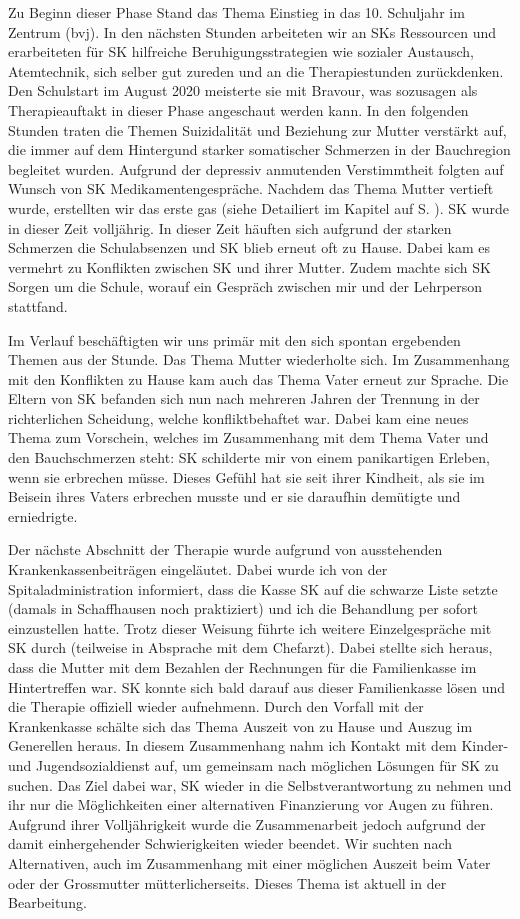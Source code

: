 Zu Beginn dieser Phase Stand das Thema Einstieg in das 10. Schuljahr im Zentrum (\ac{bvj}). In den nächsten Stunden arbeiteten wir an SKs Ressourcen und erarbeiteten für SK hilfreiche Beruhigungsstrategien wie sozialer Austausch, Atemtechnik, sich selber gut zureden und an die Therapiestunden zurückdenken. Den Schulstart im August 2020 meisterte sie mit Bravour, was sozusagen als Therapieauftakt in dieser Phase angeschaut werden kann. In den folgenden Stunden traten die Themen Suizidalität und Beziehung zur Mutter verstärkt auf, die immer auf dem Hintergund starker somatischer Schmerzen in der Bauchregion begleitet wurden. Aufgrund der depressiv anmutenden Verstimmtheit folgten auf Wunsch von SK Medikamentengespräche. Nachdem das Thema Mutter vertieft wurde, erstellten wir das erste \ac{gas} (siehe Detailiert im Kapitel \textit{ } auf S. \pageref{sec:Evaluationsverfahren}). SK wurde in dieser Zeit volljährig. In dieser Zeit häuften sich aufgrund der starken Schmerzen die Schulabsenzen und SK blieb erneut oft zu Hause. Dabei kam es vermehrt zu Konflikten zwischen SK und ihrer Mutter. Zudem machte sich SK Sorgen um die Schule, worauf ein Gespräch zwischen mir und der Lehrperson stattfand. 

Im Verlauf beschäftigten wir uns primär mit den sich spontan ergebenden Themen aus der Stunde. Das Thema Mutter wiederholte sich. Im Zusammenhang mit den Konflikten zu Hause kam auch das Thema Vater erneut zur Sprache. Die Eltern von SK befanden sich nun nach mehreren Jahren der Trennung in der richterlichen Scheidung, welche konfliktbehaftet war. Dabei kam eine neues Thema zum Vorschein, welches im Zusammenhang mit dem Thema Vater und den Bauchschmerzen steht: SK schilderte mir von einem panikartigen Erleben, wenn sie erbrechen müsse. Dieses Gefühl hat sie seit ihrer Kindheit, als sie im Beisein ihres Vaters erbrechen musste und er sie daraufhin demütigte und erniedrigte. 

Der nächste Abschnitt der Therapie wurde aufgrund von ausstehenden Krankenkassenbeiträgen eingeläutet. Dabei wurde ich von der Spitaladministration informiert, dass die Kasse SK auf die schwarze Liste setzte (damals in Schaffhausen noch praktiziert) und ich die Behandlung per sofort einzustellen hatte. Trotz dieser Weisung führte ich weitere Einzelgespräche mit SK durch (teilweise in Absprache mit dem Chefarzt). Dabei stellte sich heraus, dass die Mutter mit dem Bezahlen der Rechnungen für die Familienkasse im Hintertreffen war. SK konnte sich bald darauf aus dieser Familienkasse lösen und die Therapie offiziell wieder aufnehmenn. Durch den Vorfall mit der Krankenkasse schälte sich das Thema Auszeit von zu Hause und Auszug im Generellen heraus. In diesem Zusammenhang nahm ich Kontakt mit dem Kinder- und Jugendsozialdienst auf, um gemeinsam nach möglichen Lösungen für SK zu suchen. Das Ziel dabei war, SK wieder in die Selbstverantwortung zu nehmen und ihr nur die Möglichkeiten einer alternativen Finanzierung vor Augen zu führen. Aufgrund ihrer Volljährigkeit wurde die Zusammenarbeit jedoch aufgrund der damit einhergehender Schwierigkeiten wieder beendet. Wir suchten nach Alternativen, auch im Zusammenhang mit einer möglichen Auszeit beim Vater oder der Grossmutter mütterlicherseits. Dieses Thema ist aktuell in der Bearbeitung.

